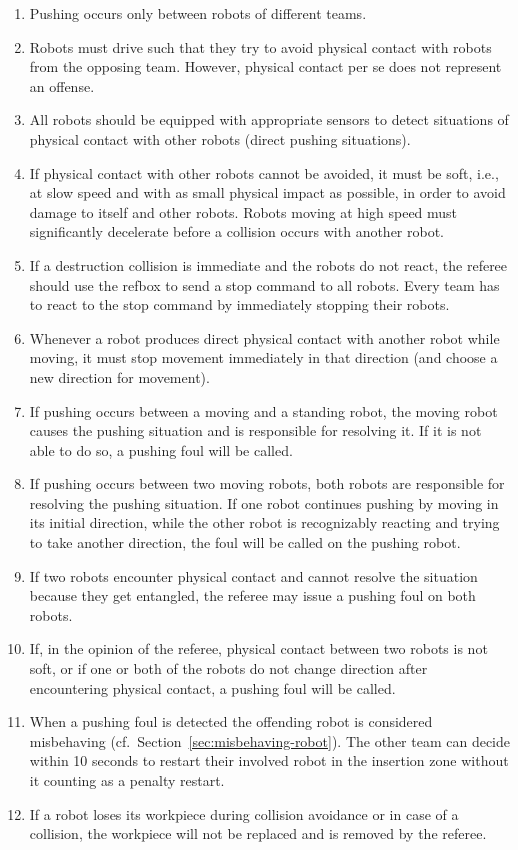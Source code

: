\documentclass[12pt,twoside]{article}
\newcommand{\refsec}[1]{Section~\ref{#1}}
\begin{document}
\begin{enumerate}
\item Pushing occurs only between robots of different teams.
\item Robots must drive such that they try to avoid physical contact
  with robots from the opposing team. However, physical contact per se
  does not represent an offense.
\item All robots should be equipped with appropriate sensors to detect
  situations of physical contact with other robots (direct pushing
  situations).
\item If physical contact with other robots cannot be avoided, it must
  be soft, i.e., at slow speed and with as small physical impact as
  possible, in order to avoid damage to itself and other
  robots. Robots moving at high speed must significantly decelerate
  before a collision occurs with another robot.
\item If a destruction collision is immediate and the robots do not
  react, the referee should use the \ac{refbox} to send a stop command to
  all robots. Every team has to react to the stop command by
  immediately stopping their robots.
\item Whenever a robot produces direct physical contact with another
  robot while moving, it must stop movement immediately in that
  direction (and choose a new direction for movement).
\item If pushing occurs between a moving and a standing robot, the
  moving robot causes the pushing situation and is responsible for
  resolving it. If it is not able to do so, a pushing foul will be
  called.
\item If pushing occurs between two moving robots, both robots are
  responsible for resolving the pushing situation. If one robot
  continues pushing by moving in its initial direction, while the
  other robot is recognizably reacting and trying to take another
  direction, the foul will be called on the pushing robot.
\item If two robots encounter physical contact and cannot resolve the
  situation because they get entangled, the referee may issue a
  pushing foul on both robots.
\item If, in the opinion of the referee, physical contact between two
  robots is not soft, or if one or both of the robots do not change
  direction after encountering physical contact, a pushing foul will
  be called.
\item When a pushing foul is detected the offending robot is considered
  misbehaving (cf.~\refsec{sec:misbehaving-robot}).
  The other team can decide within 10 seconds to restart their
  involved robot in the insertion zone without it counting as a
  penalty restart.
\item If a robot loses its workpiece during collision avoidance or in case of
  a collision, the workpiece will not be replaced and is removed by the referee.
\end{enumerate}
\end{document}
